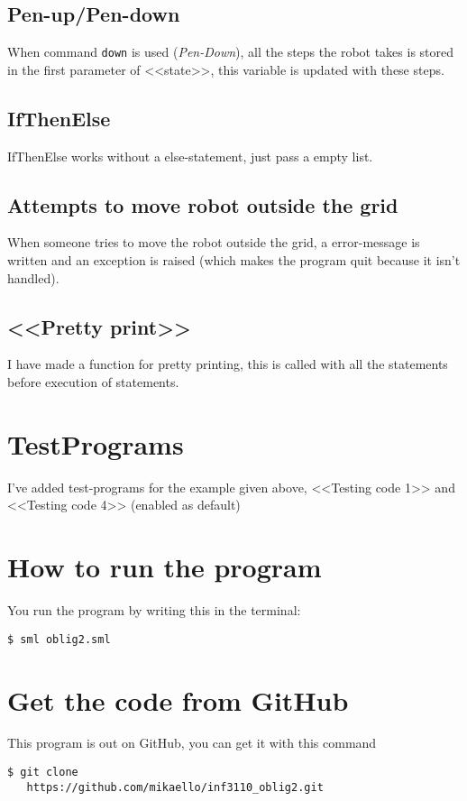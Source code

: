 \documentclass[11pt,english,a4paper]{article}
\begin{document}
\subsection{Pen-up/Pen-down}
When command \verb=down= is used (\emph{Pen-Down}), all the steps the
robot takes is stored in the first parameter of <<state>>, this
variable is updated with these steps.

\subsection{IfThenElse}
IfThenElse works without a else-statement, just pass a empty list.

\subsection{Attempts to move robot outside the grid}
When someone tries to move the robot outside the grid, a error-message
is written and an exception is raised (which makes the program quit
because it isn't handled).

\subsection{<<Pretty print>>}
I have made a function for pretty printing, this is called with all
the statements before execution of statements.

\section{TestPrograms}

I've added test-programs for the example given above, <<Testing code
1>> and <<Testing code 4>> (enabled as default)

\section{How to run the program }
You run the program by writing this in the terminal:
\begin{verbatim}
$ sml oblig2.sml
\end{verbatim}

\section{Get the code from GitHub}
This program is out on GitHub, you can get it with this command

\begin{verbatim}
$ git clone
   https://github.com/mikaello/inf3110_oblig2.git
\end{verbatim}
\end{document}
